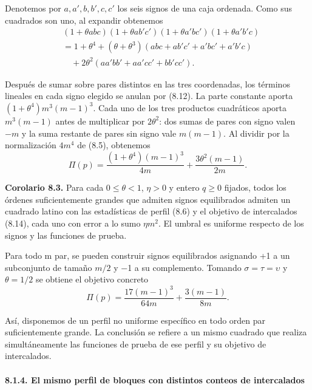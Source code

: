 \documentclass[spanish,11pt,a4paper]{article}
\begin{document}
Denotemos por \(a,a',b,b',c,c'\) los seis signos de una caja ordenada. Como sus cuadrados son uno, al expandir obtenemos
\[\begin{aligned}
&(1+\theta abc)(1+\theta ab'c')
 (1+\theta a'bc')(1+\theta a'b'c)\\
&=1+\theta^4
 +(\theta+\theta^3)(abc+ab'c'+a'bc'+a'b'c)\\
&\quad+2\theta^2(aa'bb'+aa'cc'+bb'cc').
\end{aligned}                                                       \tag{8.13}\]

Después de sumar sobre pares distintos en las tres coordenadas, los términos lineales en cada signo elegido se anulan por (8.12). La parte constante aporta \((1+\theta^4)m^3(m-1)^3\). Cada uno de los tres productos cuadráticos aporta \(m^3(m-1)\) antes de multiplicar por \(2\theta^2\): dos sumas de pares con signo valen \(-m\) y la suma restante de pares sin signo vale \(m(m-1)\). Al dividir por la normalización \(4m^4\) de (8.5), obtenemos
\[\Pi(p)=\frac{(1+\theta^4)(m-1)^3}{4m}
+\frac{3\theta^2(m-1)}{2m}.                                        \tag{8.14}\]

\textbf{Corolario 8.3.} Para cada \(0\leq\theta<1\), \(\eta>0\) y entero \(q\geq0\) fijados, todos los órdenes suficientemente grandes que admiten signos equilibrados admiten un cuadrado latino con las estadísticas de perfil (8.6) y el objetivo de intercalados (8.14), cada uno con error a lo sumo \(\eta m^2\). El umbral es uniforme respecto de los signos y las funciones de prueba.

Para todo m par, se pueden construir signos equilibrados asignando +1 a un subconjunto de tamaño \(m/2\) y −1 a su complemento. Tomando \(\sigma=\tau=\upsilon\) y \(\theta=1/2\) se obtiene el objetivo concreto
\[\Pi(p)=\frac{17(m-1)^3}{64m}+\frac{3(m-1)}{8m}.                     \tag{8.15}\]

Así, disponemos de un perfil no uniforme específico en todo orden par suficientemente grande. La conclusión se refiere a un mismo cuadrado que realiza simultáneamente las funciones de prueba de ese perfil y su objetivo de intercalados.

\paragraph{8.1.4. El mismo perfil de bloques con distintos conteos de intercalados}\label{el-mismo-perfil-de-bloques-con-distintos-conteos-de-intercalados}
\end{document}
